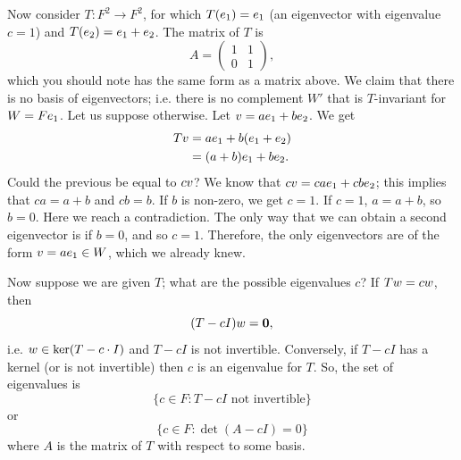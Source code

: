 \documentclass[11pt, oneside]{amsart}
\numberwithin{equation}{section}
\numberwithin{theorem}{section}
\theoremstyle{definition}
\let\bf\relax
\def\0{\mathbf{0}}
\begin{document}
Now consider $T:F^2\to F^2$, for which $T(\bf e_1) = \bf e_1$ (an eigenvector with eigenvalue $c=1$) and $T(\bf e_2) = \bf e_1+\bf e_2$. The matrix of $T$ is
$$
A = \begin{pmatrix} 1 & 1\\ 0 &1 \end{pmatrix},
$$
which you should note has the same form as a matrix above. We claim that there is no basis of eigenvectors; i.e. there is no complement $W'$ that is $T$-invariant for $W=F\bf e_1$. Let us suppose otherwise. Let $\bf v = a\bf e_1 + b\bf e_2$. We get 
\begin{align*}
T\bf v &= a\bf e_1 +b(\bf e_1+\bf  e_2)\\
          &= (a+b)\bf e_1 + b\bf e_2.
\end{align*}
Could the previous be equal to $c\bf v$? We know that $c\bf v = ca\bf e_1 + cb\bf e_2$; this implies that $ca = a+b$ and $cb = b$. If $b$ is non-zero, we get $c=1$. If $c=1$, $a = a+b$, so $b=0$. Here we reach a contradiction. The only way that we can obtain a second eigenvector is if $b=0$, and so $c=1$. Therefore, the only eigenvectors are of the form $\bf v = a\bf e_1\in W$, which we already knew.

Now suppose we are given $T$; what are the possible eigenvalues $c$? If $T\bf w = c\bf w$, then
$$
(T - c I)\bf w = \0,
$$
i.e. $\bf w \in \ker(T - c\cdot I)$ and $T - c I$ is not invertible. Conversely, if $T-cI$ has a kernel (or is not invertible) then $c$ is an eigenvalue for $T$. So, the set of eigenvalues is
$$
\{c\in F : T-cI \textrm{ not invertible}\}
$$
or 
$$
\{c\in F : \det(A-cI)=0\}
$$
where $A$ is the matrix of $T$ with respect to some basis. 
\end{document}
